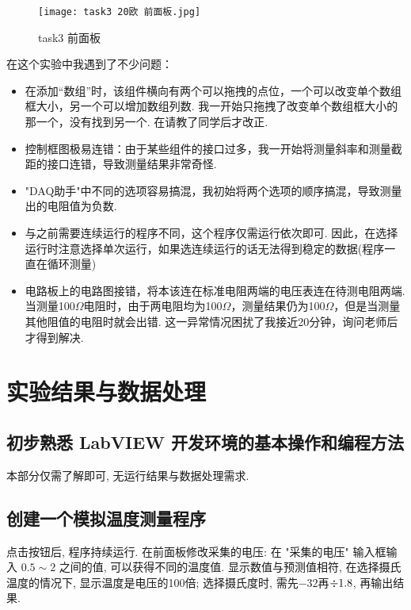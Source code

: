 \documentclass[11pt]{article}
\begin{document}
\begin{figure}[h]
	\centering
	\texttt{[image: task3 20欧 前面板.jpg]}
	\caption{task3 前面板}
	\label{fig:task3 前面板}
\end{figure}

在这个实验中我遇到了不少问题：
\begin{itemize}
	\item 在添加“数组”时，该组件横向有两个可以拖拽的点位，一个可以改变单个数组框大小，另一个可以增加数组列数. 我一开始只拖拽了改变单个数组框大小的那一个，没有找到另一个. 在请教了同学后才改正.
	\item 控制框图极易连错：由于某些组件的接口过多，我一开始将测量斜率和测量截距的接口连错，导致测量结果非常奇怪.
	\item "DAQ助手"中不同的选项容易搞混，我初始将两个选项的顺序搞混，导致测量出的电阻值为负数.
	\item 与之前需要连续运行的程序不同，这个程序仅需运行依次即可. 因此，在选择运行时注意选择单次运行，如果选连续运行的话无法得到稳定的数据(程序一直在循环测量)
	\item 电路板上的电路图接错，将本该连在标准电阻两端的电压表连在待测电阻两端. 当测量100$\Omega$电阻时，由于两电阻均为100$\Omega$，测量结果仍为100$\Omega$，但是当测量其他阻值的电阻时就会出错. 这一异常情况困扰了我接近20分钟，询问老师后才得到解决.
\end{itemize}

\section{实验结果与数据处理}


	
	\subsection{初步熟悉 LabVIEW 开发环境的基本操作和编程方法}
	
	本部分仅需了解即可, 无运行结果与数据处理需求.
		
	\subsection{创建一个模拟温度测量程序}
		
	点击按钮后, 程序持续运行. 在前面板修改采集的电压: 在 "采集的电压" 输入框输入 $0.5 \sim 2$ 之间的值, 可以获得不同的温度值. 显示数值与预测值相符, 在选择摄氏温度的情况下, 显示温度是电压的100倍; 选择摄氏度时, 需先$-32$再$\divisionsymbol 1.8$, 再输出结果.
\end{document}
